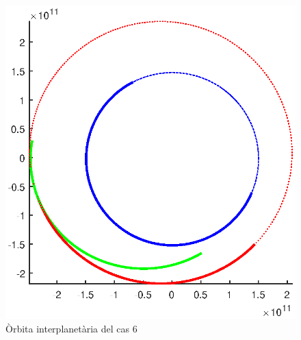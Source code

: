 \begin{figure}[H]
	\centering
	\includegraphics[scale=0.8]{./plots/cas6}
	\caption{Òrbita interplanetària del cas 6}
\end{figure}

